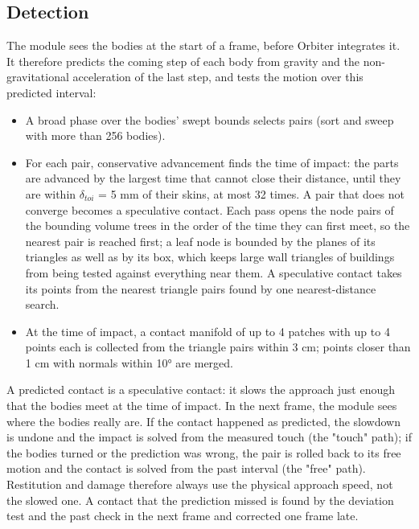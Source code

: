 \documentclass[Orbiter Technical Reference.tex]{subfiles}
\begin{document}
\subsection{Detection}
The module sees the bodies at the start of a frame, before Orbiter integrates it. It therefore predicts the coming step of each body from gravity and the non-gravitational acceleration of the last step, and tests the motion over this predicted interval:

\begin{itemize}
\item A broad phase over the bodies' swept bounds selects pairs (sort and sweep with more than 256 bodies).
\item For each pair, conservative advancement finds the time of impact: the parts are advanced by the largest time that cannot close their distance, until they are within $\delta_{toi}$ = 5 mm of their skins, at most 32 times. A pair that does not converge becomes a speculative contact. Each pass opens the node pairs of the bounding volume trees in the order of the time they can first meet, so the nearest pair is reached first; a leaf node is bounded by the planes of its triangles as well as by its box, which keeps large wall triangles of buildings from being tested against everything near them. A speculative contact takes its points from the nearest triangle pairs found by one nearest-distance search.
\item At the time of impact, a contact manifold of up to 4 patches with up to 4 points each is collected from the triangle pairs within 3 cm; points closer than 1 cm with normals within 10° are merged.
\end{itemize}

\noindent
A predicted contact is a speculative contact: it slows the approach just enough that the bodies meet at the time of impact. In the next frame, the module sees where the bodies really are. If the contact happened as predicted, the slowdown is undone and the impact is solved from the measured touch (the "touch" path); if the bodies turned or the prediction was wrong, the pair is rolled back to its free motion and the contact is solved from the past interval (the "free" path). Restitution and damage therefore always use the physical approach speed, not the slowed one. A contact that the prediction missed is found by the deviation test and the past check in the next frame and corrected one frame late.
\end{document}
